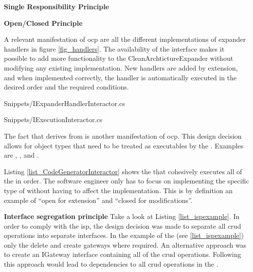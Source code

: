 \textbf{Single Responsibility Principle}



    \textbf{Open/Closed Principle}
    
A relevant manifestation of \gls{ocp} are all the different implementations of expander
handlers in figure \ref{fig_handlers}. The availability of the
 interface makes it possible to add more
functionality to the CleanArchtictureExpander without modifying any existing
implementation. New handlers are added by extension, and when implemented correctly, the
handler is automatically executed in the desired order and the required conditions.


    {Snippets/IExpanderHandlerInteractor.cs}


    {Snippets/IExecutionInteractor.cs}

The fact that  derives from
 is another manifestation of \gls{ocp}. This
design decision allows for object types that need to be treated as executables by the
. Examples are
,
,
 and
. 

Listing \ref{list_CodeGeneratorInteractor} shows the
 that cohesively executes all of the
 in order. The software engineer only has to focus on
implementing the specific type of  without having to
affect the implementation. This is by definition an example of \enquote{open for
extension} and \enquote{closed for modifications}.



\textbf{Interface segregation principle}
Take a look at Listing \ref{list_ispexample}. In order to comply with the \gls{isp}, the
design decision was made to separate all \gls{crud} operations into separate interfaces.
In the example of the  (see \ref{list_ispexample})
only the delete and create gateways where required. An alternative approach was to create
an IGateway interface containing all of the \gls{crud} operations. Following this approach
would lead to dependencies to all \gls{crud} operations in the
.


